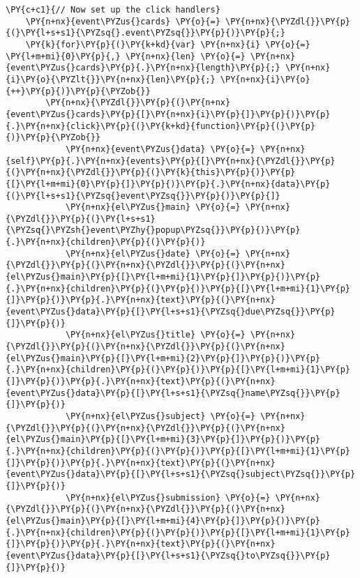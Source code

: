\begin{Verbatim}[commandchars=\\\{\}]
    \PY{c+c1}{// Now set up the click handlers}
    \PY{n+nx}{event\PYZus{}cards} \PY{o}{=} \PY{n+nx}{\PYZdl{}}\PY{p}{(}\PY{l+s+s1}{\PYZsq{}.event\PYZsq{}}\PY{p}{)}\PY{p}{;}
    \PY{k}{for}\PY{p}{(}\PY{k+kd}{var} \PY{n+nx}{i} \PY{o}{=} \PY{l+m+mi}{0}\PY{p}{,} \PY{n+nx}{len} \PY{o}{=} \PY{n+nx}{event\PYZus{}cards}\PY{p}{.}\PY{n+nx}{length}\PY{p}{;} \PY{n+nx}{i}\PY{o}{\PYZlt{}}\PY{n+nx}{len}\PY{p}{;} \PY{n+nx}{i}\PY{o}{++}\PY{p}{)}\PY{p}{\PYZob{}}
        \PY{n+nx}{\PYZdl{}}\PY{p}{(}\PY{n+nx}{event\PYZus{}cards}\PY{p}{[}\PY{n+nx}{i}\PY{p}{]}\PY{p}{)}\PY{p}{.}\PY{n+nx}{click}\PY{p}{(}\PY{k+kd}{function}\PY{p}{(}\PY{p}{)}\PY{p}{\PYZob{}}
            \PY{n+nx}{event\PYZus{}data} \PY{o}{=} \PY{n+nx}{self}\PY{p}{.}\PY{n+nx}{events}\PY{p}{[}\PY{n+nx}{\PYZdl{}}\PY{p}{(}\PY{n+nx}{\PYZdl{}}\PY{p}{(}\PY{k}{this}\PY{p}{)}\PY{p}{[}\PY{l+m+mi}{0}\PY{p}{]}\PY{p}{)}\PY{p}{.}\PY{n+nx}{data}\PY{p}{(}\PY{l+s+s1}{\PYZsq{}event\PYZsq{}}\PY{p}{)}\PY{p}{]}
            \PY{n+nx}{el\PYZus{}main} \PY{o}{=} \PY{n+nx}{\PYZdl{}}\PY{p}{(}\PY{l+s+s1}{\PYZsq{}\PYZsh{}event\PYZhy{}popup\PYZsq{}}\PY{p}{)}\PY{p}{.}\PY{n+nx}{children}\PY{p}{(}\PY{p}{)}
            \PY{n+nx}{el\PYZus{}date} \PY{o}{=} \PY{n+nx}{\PYZdl{}}\PY{p}{(}\PY{n+nx}{\PYZdl{}}\PY{p}{(}\PY{n+nx}{el\PYZus{}main}\PY{p}{[}\PY{l+m+mi}{1}\PY{p}{]}\PY{p}{)}\PY{p}{.}\PY{n+nx}{children}\PY{p}{(}\PY{p}{)}\PY{p}{[}\PY{l+m+mi}{1}\PY{p}{]}\PY{p}{)}\PY{p}{.}\PY{n+nx}{text}\PY{p}{(}\PY{n+nx}{event\PYZus{}data}\PY{p}{[}\PY{l+s+s1}{\PYZsq{}due\PYZsq{}}\PY{p}{]}\PY{p}{)}
            \PY{n+nx}{el\PYZus{}title} \PY{o}{=} \PY{n+nx}{\PYZdl{}}\PY{p}{(}\PY{n+nx}{\PYZdl{}}\PY{p}{(}\PY{n+nx}{el\PYZus{}main}\PY{p}{[}\PY{l+m+mi}{2}\PY{p}{]}\PY{p}{)}\PY{p}{.}\PY{n+nx}{children}\PY{p}{(}\PY{p}{)}\PY{p}{[}\PY{l+m+mi}{1}\PY{p}{]}\PY{p}{)}\PY{p}{.}\PY{n+nx}{text}\PY{p}{(}\PY{n+nx}{event\PYZus{}data}\PY{p}{[}\PY{l+s+s1}{\PYZsq{}name\PYZsq{}}\PY{p}{]}\PY{p}{)}
            \PY{n+nx}{el\PYZus{}subject} \PY{o}{=} \PY{n+nx}{\PYZdl{}}\PY{p}{(}\PY{n+nx}{\PYZdl{}}\PY{p}{(}\PY{n+nx}{el\PYZus{}main}\PY{p}{[}\PY{l+m+mi}{3}\PY{p}{]}\PY{p}{)}\PY{p}{.}\PY{n+nx}{children}\PY{p}{(}\PY{p}{)}\PY{p}{[}\PY{l+m+mi}{1}\PY{p}{]}\PY{p}{)}\PY{p}{.}\PY{n+nx}{text}\PY{p}{(}\PY{n+nx}{event\PYZus{}data}\PY{p}{[}\PY{l+s+s1}{\PYZsq{}subject\PYZsq{}}\PY{p}{]}\PY{p}{)}
            \PY{n+nx}{el\PYZus{}submission} \PY{o}{=} \PY{n+nx}{\PYZdl{}}\PY{p}{(}\PY{n+nx}{\PYZdl{}}\PY{p}{(}\PY{n+nx}{el\PYZus{}main}\PY{p}{[}\PY{l+m+mi}{4}\PY{p}{]}\PY{p}{)}\PY{p}{.}\PY{n+nx}{children}\PY{p}{(}\PY{p}{)}\PY{p}{[}\PY{l+m+mi}{1}\PY{p}{]}\PY{p}{)}\PY{p}{.}\PY{n+nx}{text}\PY{p}{(}\PY{n+nx}{event\PYZus{}data}\PY{p}{[}\PY{l+s+s1}{\PYZsq{}to\PYZsq{}}\PY{p}{]}\PY{p}{)}

\end{Verbatim}
